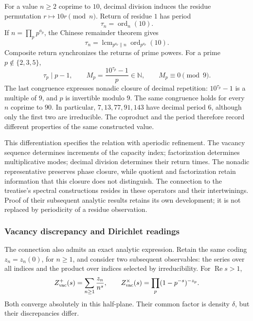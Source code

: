 For a value \(n\geq2\) coprime to \(10\), decimal division induces
the residue permutation \(r\mapsto10r\pmod n\). Return of residue
\(1\) has period
\[
 \tau_n=\operatorname{ord}_n(10).
\]
If \(n=\prod_p p^{a_p}\), the Chinese remainder theorem gives
\[
 \tau_n=\operatorname{lcm}_{p^{a_p}\parallel n}
                    \operatorname{ord}_{p^{a_p}}(10).
\]
Composite return synchronizes the returns of prime powers.
For a prime \(p\notin\{2,3,5\}\),
\[
 \tau_p\mid p-1,\qquad
 M_p=\frac{10^{\tau_p}-1}{p}\in\mathbb N,
 \qquad M_p\equiv0\pmod9.
\]
The last congruence expresses nonadic closure of decimal repetition:
\(10^{\tau_p}-1\) is a multiple of \(9\), and \(p\) is invertible
modulo \(9\). The same congruence holds for every \(n\) coprime
to \(90\). In particular, \(7,13,77,91,143\) have decimal period
\(6\), although only the first two are irreducible. The coproduct and
the period therefore record different properties of the same constructed value.

This differentiation specifies the relation with aperiodic refinement.
The vacancy sequence determines increments of the capacity index;
factorization determines multiplicative modes; decimal division
determines their return times. The nonadic representative preserves
phase closure, while quotient and factorization retain information
that this closure does not distinguish. The connection to the treatise's
spectral constructions resides in these operators and their intertwinings.
Proof of their subsequent analytic results retains its own development;
it is not replaced by periodicity of a residue observation.

\subsubsection{Vacancy discrepancy and Dirichlet readings}

The connection also admits an exact analytic expression. Retain the
same coding \(z_n=z_n(0)\), for \(n\geq1\), and consider two
subsequent observables: the series over all indices and the product
over indices selected by irreducibility. For \(\operatorname{Re}s>1\),
\[
 Z_{\rm vac}^{+}(s)=\sum_{n\geq1}\frac{z_n}{n^s},\qquad
 Z_{\rm vac}^{\times}(s)=\prod_p(1-p^{-s})^{-z_p}.
\]
Both converge absolutely in this half-plane. Their common factor is
density \(\delta\), but their discrepancies differ.

